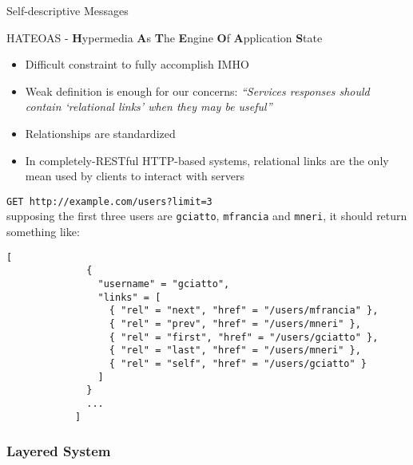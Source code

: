 \begin{frame}
\begin{block}{Self-descriptive Messages}
\begin{itemize}
		\end{itemize}
	\end{block}
	
	\framebreak
	
	\begin{block}{HATEOAS - \textbf{H}ypermedia \textbf{A}s \textbf{T}he \textbf{E}ngine \textbf{O}f \textbf{A}pplication \textbf{S}tate}
			
		\begin{itemize}
			\item Difficult constraint to fully accomplish IMHO
			\item Weak definition is enough for our concerns: \emph{``Services responses should contain \emph{`relational links'} when they may be useful''}
			\item Relationships are standardized
			\item In completely-RESTful HTTP-based systems, relational links are the only mean used by clients to interact with servers
		\end{itemize}
	\end{block}
	
	\begin{example}
		\texttt{GET http://example.com/users?limit=3} \\
		supposing the first three users are \texttt{gciatto}, \texttt{mfrancia} and \texttt{mneri}, it should return something like:
		\begin{lstlisting}[basicstyle=\scriptsize]
			[
			  {
			    "username" = "gciatto",
			    "links" = [
			      { "rel" = "next", "href" = "/users/mfrancia" },
			      { "rel" = "prev", "href" = "/users/mneri" },
			      { "rel" = "first", "href" = "/users/gciatto" },
			      { "rel" = "last", "href" = "/users/mneri" },
			      { "rel" = "self", "href" = "/users/gciatto" }
			    ]
			  }
			  ...
			]
		\end{lstlisting}
	\end{example}
		
\end{frame}

\subsubsection{Layered System}

